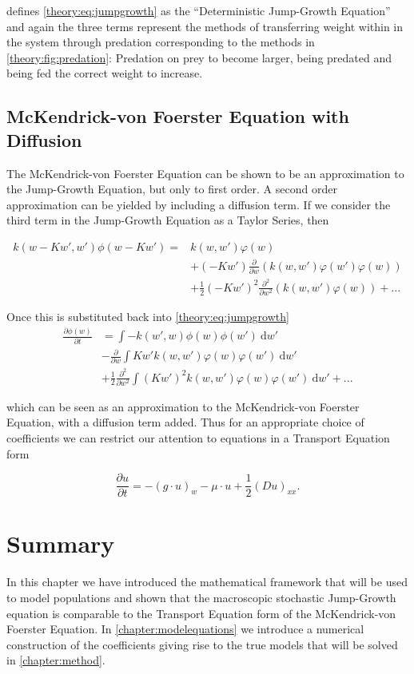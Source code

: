 \documentclass[../main.tex]{subfiles}
\begin{document}
  \cite{datta2010} defines \autoref{theory:eq:jumpgrowth} as the ``Deterministic Jump-Growth Equation'' and again the three terms represent the methods of transferring weight within in the system through predation corresponding to the methods in \autoref{theory:fig:predation}: Predation on prey to become larger, being predated and being fed the correct weight to increase.

  \subsection{McKendrick-von Foerster Equation with Diffusion}\label{theory:sec:mvfdiffusion}
  The McKendrick-von Foerster Equation can be shown to be an approximation to the Jump-Growth Equation, but only to first order. A second order approximation can be yielded by including a diffusion term. If we consider the third term in the Jump-Growth Equation as a Taylor Series, then

  \begin{align}
    k(w - Kw', w')\phi(w - K w')
    = & k(w, w') \varphi(w) \nonumber \\
      & + (-K w') \frac{\partial}{\partial w} \left(k(w, w')\varphi(w')\varphi(w)\right) \nonumber \\
      & + \frac{1}{2}(-K w')^2 \frac{\partial^2}{\partial w^2} \left(k(w, w')\varphi(w)\right) + ...
  \end{align}

  Once this is substituted back into \autoref{theory:eq:jumpgrowth}
  \begin{align}\label{theory:eq:jumpdiffusion}
    \frac{\partial \phi(w)}{\partial t}
    & = \int - k(w', w) \phi(w)\phi(w')  \: \mathrm{d}w' \nonumber \\
    & - \frac{\partial}{\partial w} \int K w' k(w, w')\varphi(w)\varphi(w') \: \mathrm{d}w' \nonumber \\
    & + \frac{1}{2}\frac{\partial^2}{\partial w^2} \int (K w')^2 k(w, w')\varphi(w)\varphi(w') \: \mathrm{d}w' + ...
  \end{align}

  which can be seen as an approximation to the McKendrick-von Foerster Equation, with a diffusion term added. Thus for an appropriate choice of coefficients we can restrict our attention to equations in a Transport Equation form

  \begin{equation}\label{theory:eq:jumptransport}
    \frac{\partial u}{\partial t} = - (g \cdot u)_w - \mu \cdot u + \frac{1}{2}(D u)_{xx}.
  \end{equation}

  \section{Summary}
  In this chapter we have introduced the mathematical framework that will be used to model populations and shown that the macroscopic stochastic Jump-Growth equation is comparable to the Transport Equation form of the McKendrick-von Foerster Equation. In \autoref{chapter:modelequations} we introduce a numerical construction of the coefficients giving rise to the true models that will be solved in \autoref{chapter:method}.
\end{document}
